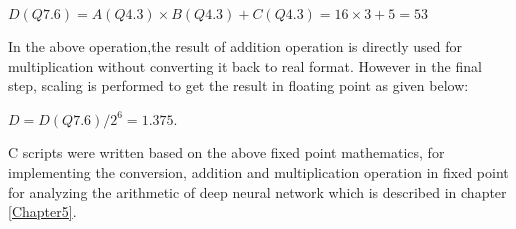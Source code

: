 \noindent $D(Q7.6)= A(Q4.3)\times B(Q4.3)+C(Q4.3)= 16\times 3+5= 53$

\vspace{0.25cm}
\noindent In the above operation,the result of addition operation is directly used for multiplication without converting it back to real format. However in the final step, scaling is performed to get the result in floating point as given below:

\noindent $D= D(Q7.6)/2^{6}= 1.375$.

\vspace{0.25cm}
C scripts were written based on the above fixed point mathematics, for implementing the conversion, addition and multiplication operation in fixed point for analyzing the arithmetic of deep neural network which is described in chapter \ref{Chapter5}. 